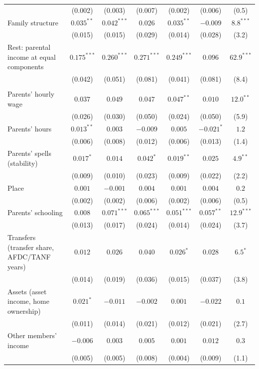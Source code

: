 \begin{table}[!htbp]
{{\begin{tabular}{lcccccc}
 & (0.002) & (0.003) & (0.007) & (0.002) & (0.006) & (0.5) \\
Family structure & $0.035^{**}$ & $0.042^{***}$ & $0.026$ & $0.035^{**}$ & $-0.009$ & $8.8^{***}$ \\
 & (0.015) & (0.015) & (0.029) & (0.014) & (0.028) & (3.2) \\
Rest: parental income at equal components & $0.175^{***}$ & $0.260^{***}$ & $0.271^{***}$ & $0.249^{***}$ & $0.096$ & $62.9^{***}$ \\
 & (0.042) & (0.051) & (0.081) & (0.041) & (0.081) & (8.4) \\
\addlinespace
\multicolumn{7}{l}{\textit{B. With the parents' other resources}} \\
Parents' hourly wage & $0.037$ & $0.049$ & $0.047$ & $0.047^{**}$ & $0.010$ & $12.0^{**}$ \\
 & (0.026) & (0.030) & (0.050) & (0.024) & (0.050) & (5.9) \\
Parents' hours & $0.013^{**}$ & $0.003$ & $-0.009$ & $0.005$ & $-0.021^{*}$ & $1.2$ \\
 & (0.006) & (0.008) & (0.012) & (0.006) & (0.013) & (1.4) \\
Parents' spells (stability) & $0.017^{*}$ & $0.014$ & $0.042^{*}$ & $0.019^{**}$ & $0.025$ & $4.9^{**}$ \\
 & (0.009) & (0.010) & (0.023) & (0.009) & (0.022) & (2.2) \\
Place & $0.001$ & $-0.001$ & $0.004$ & $0.001$ & $0.004$ & $0.2$ \\
 & (0.002) & (0.002) & (0.006) & (0.002) & (0.006) & (0.5) \\
Parents' schooling & $0.008$ & $0.071^{***}$ & $0.065^{***}$ & $0.051^{***}$ & $0.057^{**}$ & $12.9^{***}$ \\
 & (0.013) & (0.017) & (0.024) & (0.014) & (0.024) & (3.7) \\
Transfers (transfer share, AFDC/TANF years) & $0.012$ & $0.026$ & $0.040$ & $0.026^{*}$ & $0.028$ & $6.5^{*}$ \\
 & (0.014) & (0.019) & (0.036) & (0.015) & (0.037) & (3.8) \\
Assets (asset income, home ownership) & $0.021^{*}$ & $-0.011$ & $-0.002$ & $0.001$ & $-0.022$ & $0.1$ \\
 & (0.011) & (0.014) & (0.021) & (0.012) & (0.021) & (2.7) \\
Other members' income & $-0.006$ & $0.003$ & $0.005$ & $0.001$ & $0.012$ & $0.3$ \\
 & (0.005) & (0.005) & (0.008) & (0.004) & (0.009) & (1.1) \\

\end{tabular}}}
\end{table}

